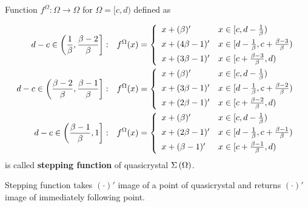 \documentclass[text.tex]{subfiles}
\begin{document}
\begin{definition}
\label{def:steppingFunction}
Function $f^\Omega: \Omega \to \Omega$ for $\Omega = [c,d)$ defined as

\begin{align*}
d-c \in \left( \frac{1}{\beta}, \frac{\beta - 2}{\beta} \right]:& \quad
		f^\Omega(x) = \left\{ \begin{array}{l l}
			x + (\beta)' 	& x\in [c,d-\frac{1}{\beta})\\[1.5mm]
			x + (4\beta-1)' & x\in [d-\frac{1}{\beta},c+\frac{\beta - 3}{\beta})\\[1.5mm]
			x + (3\beta-1)' & x\in [c+\frac{\beta - 3}{\beta},d)
		\end{array} \right.
\\
d-c \in \left( \frac{\beta-2}{\beta}, \frac{\beta-1}{\beta} \right]:& \quad
		f^\Omega(x) = \left\{ \begin{array}{l l}
			x + (\beta)' 	& x\in [c,d-\frac{1}{\beta})\\[1.5mm]
			x + (3\beta-1)' & x\in [d-\frac{1}{\beta},c+\frac{\beta - 2}{\beta})\\[1.5mm]
			x + (2\beta-1)' & x\in [c+\frac{\beta - 2}{\beta},d)
		\end{array} \right.
\\
d-c \in \left( \frac{\beta-1}{\beta}, 1 \right]:& \quad
		f^\Omega(x) = \left\{ \begin{array}{l l}
			x + (\beta)' 	& x\in [c,d-\frac{1}{\beta})\\[1.5mm]
			x + (2\beta-1)' & x\in [d-\frac{1}{\beta},c+\frac{\beta - 1}{\beta})\\[1.5mm]
			x + (\beta-1)' & x\in [c+\frac{\beta - 1}{\beta},d)
		\end{array} \right.
\end{align*}
is called \textbf{stepping function} of quasicrystal $\Sigma\left(\Omega\right)$. 
\end{definition}

\begin{remark}
Stepping function takes $(\cdot)'$ image of a point of quasicrystal and returns $(\cdot)'$ image of immediately following point.\\
\end{remark}
\end{document}
